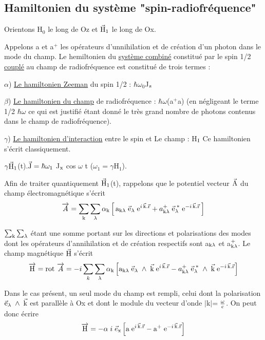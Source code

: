 \subsection{Hamiltonien du système "spin-radiofréquence"}%

Orientons H$_0$ le long de Oz et $\vec{\text{H}}_1$ le long de Ox.

Appelons a et a$^+$ les opérateurs d'unnihilation et de création d'un
photon dans le mode du champ. Le hemiltonien du \ul{système combiné} constitué par
le spin 1/2 \ul{couplé} au champ de radiofréquence est constitué de trois termes :

$\alpha$) \ul{Le hamiltonien Zeeman} du spin 1/2 : $\hbar\omega_0$J$_{\text{z}}$

$\beta$) \ul{Le hamiltonien du champ} de radiofréquence : $\hbar\omega$(a$^+$a)
(en négligeant le terme 1/2 $\hbar\omega$ ce qui est justifié étant donné le très grand
nombre de photons contenus dans le champ de radiofréquence).

$\gamma$) \ul{Le hamiltonien d'interaction} entre le spin et Le champ : H$_{\text{I}}$
Ce hamiltonien s'écrit classiquement.
\begin{center}
$\gamma\vec{\text{H}}_1$(t).$\vec{\text{J}}=\hbar\omega_1$ J$_{\text{x}}$ cos $\omega$ t \qquad ($\omega_1=\gamma$H$_1$).
\end{center}


Afin de traiter quantiquement $\vec{\text{H}}_1$(t), rappelons que le potentiel
vecteur $\vec{\text{A}}$ du champ électromagnétique s'écrit
\[
\overrightarrow{A}=\sum_{\text{k}}\sum_\lambda\alpha_{\text{k}}\left[\,\text{a}_{\text{k}\lambda}\;\vec{\text{e}}_\lambda\;
\text{e}^{i\,\vec{\text{k}}.\vec{\text{r}}}+
a^+_{\text{k}\lambda}\;\vec{\text{e}}^{\;*}_\lambda\;\text{e}^{-i\,\vec{\text{k}}.\vec{\text{r}}}\,\right]
\]

$\sum_{\text{k}}\sum_\lambda$ étant une somme portant sur les directions et polarisations des modes
dont les opérateurs d'annihilation et de création respectifs sont a$_{\text{k}\lambda}$ et a$^+_{\text{k}\lambda}$.
Le champ magnétique $\vec{\text{H}}$ s'écrit
\[
\overrightarrow{\text{H}}=\text{rot }\overrightarrow{A}=-i\sum_k\sum_\lambda\alpha_{\text{k}}\left[\text{a}_{\text{k}\lambda}\;\vec{\text{e}}_\lambda\;\wedge\;\vec{\text{k}}
\;\text{e}^{i\,\vec{\text{k}}.\vec{\text{r}}}-a^+_{\text{k}\lambda}\;\vec{\text{e}}^{\;*}_\lambda\;\wedge\;\vec{\text{k}}
\;\text{e}^{-i\,\vec{\text{k}}.\vec{\text{r}}}\right]
\]

Dans le cas présent, un seul mode du champ est rempli, celui dont la polarisation
$\vec{\text{e}}_\lambda\;\wedge\;\vec{\text{k}}$
est parallèle à Ox et dont le module du vecteur d'onde $|$k$|$$=\frac{\omega}{\text{c}}$.
On peut donc écrire
\[
\overrightarrow{\text{H}}=-\alpha\;i\;\vec{e}_{\text{x}}\left[\text{a}\;\text{e}^{i\,\vec{\text{k}}.\vec{\text{r}}}
-\text{a}^+\;\text{e}^{-i\,\vec{\text{k}}.\vec{\text{r}}}\right]
\]

